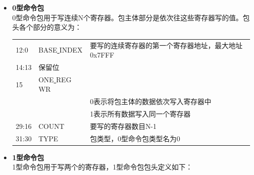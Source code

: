 \begin{itemize}

\item{\textbf{0型命令包}} \\
0型命令包用于写连续N个寄存器。包主体部分是依次往这些寄存器写的值。包头各个部分的意义为：

\begin{center}  
\tablelasttail{\bottomrule}

\begin{supertabular}{p{2.cm}p{3.cm}m{10.cm}}
	12:0 & BASE\underline{ }INDEX & 要写的连续寄存器的第一个寄存器地址，最大地址0x7FFF \\
	14:13 & 保留位 & \\
	15 & ONE\underline{ }REG\underline{ }WR &  \\ 
	& & \tabitem 0表示将包主体的数据依次写入寄存器中 \\
	& & \tabitem 1表示所有数据写入同一个寄存器 \\
	29:16 & COUNT & 要写的寄存器数目N-1 \\
	31:30 & TYPE & 包类型，0型命令包类型名为0 \\
\end{supertabular}
\end{center}
 

\item{\textbf{1型命令包}} \\
1型命令包用于写两个的寄存器，1型命令包包头定义如下：

\begin{center}  
\tablelasttail{\bottomrule}


\end{center}
\end{itemize}
